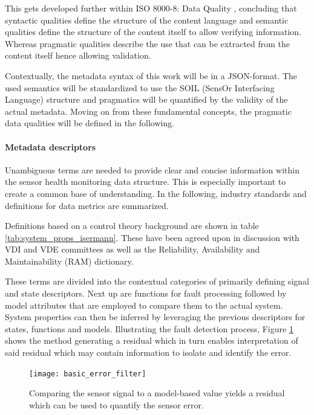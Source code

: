 This gets developed further within ISO 8000-8: Data Quality \cite{iso_data-quality_information_2015}, concluding that syntactic qualities define the structure of the content language and semantic qualities define the structure of the content itself to allow verifying information. Whereas pragmatic qualities describe the use that can be extracted from the content itself hence allowing validation.

Contextually, the metadata syntax of this work will be in a JSON-format. The used semantics will be standardized to use the SOIL (SensOr Interfacing Language) structure and pragmatics will be quantified by the validity of the actual metadata. Moving on from these fundamental concepts, the pragmatic data qualities will be defined in the following.

\paragraph{Metadata descriptors}

Unambiguous terms are needed to provide clear and concise information within the sensor health monitoring data structure. This is especially important to create a common base of understanding. In the following, industry standards and definitions for data metrics are summarized.

Definitions based on a control theory background are shown in table \ref{tab:system_props_isermann}. These have been agreed upon in discussion with VDI and VDE committees as well as the Reliability, Availability and Maintainability (RAM) dictionary. \cite{isermann_trends_nodate,din_din25424_fehlerbaumanalysepdf_1977}

These terms are divided into the contextual categories of primarily defining signal and state descriptors. Next up are functions for fault processing followed by model attributes that are employed to compare them to the actual system. System properties can then be inferred by leveraging the previous descriptors for states, functions and models. Illustrating the fault detection process, Figure \ref{fig:basic_error_filter} shows the method generating a residual which in turn enables interpretation of said residual which may contain information to isolate and identify the error.


\begin{figure}[ht]
    \centering
    \texttt{[image: basic\_error\_filter]}
    \caption[Model-Based Sensor Monitoring]{Comparing the sensor signal to a model-based value yields a residual which can be used to quantify the sensor error.}
    \label{fig:basic_error_filter}
\end{figure}




